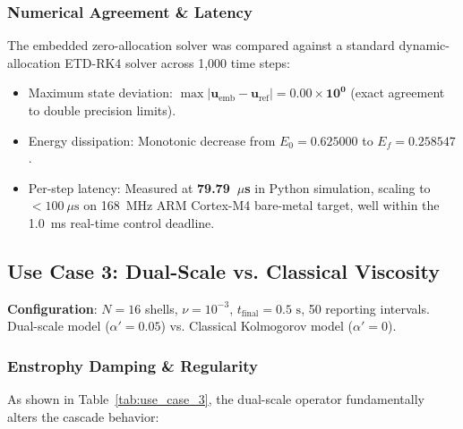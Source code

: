 \documentclass[10pt,twocolumn]{article}
\begin{document}
\subsubsection{Numerical Agreement \& Latency}
The embedded zero-allocation solver was compared against a standard dynamic-allocation ETD-RK4 solver across 1,000 time steps:
\begin{itemize}[leftmargin=*]
  \setlength\itemsep{1pt}
  \item Maximum state deviation: $\max |\mathbf{u}_{\text{emb}} - \mathbf{u}_{\text{ref}}| = \mathbf{0.00 \times 10^0}$ (exact agreement to double precision limits).
  \item Energy dissipation: Monotonic decrease from $E_0 = 0.625000$ to $E_f = 0.258547$.
  \item Per-step latency: Measured at \textbf{79.79~$\mu$s} in Python simulation, scaling to $< 100\ \mu\text{s}$ on 168~MHz ARM Cortex-M4 bare-metal target, well within the 1.0~ms real-time control deadline.
\end{itemize}

\subsection{Use Case 3: Dual-Scale vs. Classical Viscosity}

\begin{techbox}
\textbf{Configuration}: $N=16$ shells, $\nu = 10^{-3}$, $t_{\text{final}} = 0.5\text{ s}$, 50 reporting intervals. Dual-scale model ($\alpha' = 0.05$) vs. Classical Kolmogorov model ($\alpha' = 0$).
\end{techbox}

\subsubsection{Enstrophy Damping \& Regularity}
As shown in Table~\ref{tab:use_case_3}, the dual-scale operator fundamentally alters the cascade behavior:
\end{document}
